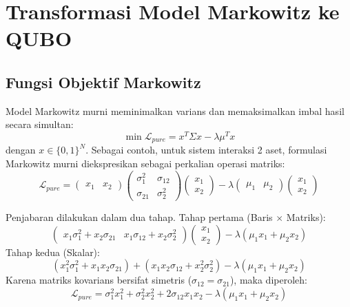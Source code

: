 \section{Transformasi Model Markowitz ke QUBO}

\subsection{Fungsi Objektif Markowitz}
Model Markowitz murni meminimalkan varians dan memaksimalkan imbal hasil secara simultan:
\begin{equation}
\min \mathcal{L}_{pure} = x^T \Sigma x - \lambda \mu^T x
\end{equation}
dengan $x \in \{0, 1\}^N$. Sebagai contoh, untuk sistem interaksi 2 aset, formulasi Markowitz murni diekspresikan sebagai perkalian operasi matriks:
\begin{equation}
\mathcal{L}_{pure} = \begin{pmatrix} x_1 & x_2 \end{pmatrix} \begin{pmatrix} \sigma_1^2 & \sigma_{12} \\ \sigma_{21} & \sigma_2^2 \end{pmatrix} \begin{pmatrix} x_1 \\ x_2 \end{pmatrix} - \lambda \begin{pmatrix} \mu_1 & \mu_2 \end{pmatrix} \begin{pmatrix} x_1 \\ x_2 \end{pmatrix}
\end{equation}

Penjabaran dilakukan dalam dua tahap. Tahap pertama (Baris $\times$ Matriks):
\begin{equation}
\begin{pmatrix} x_1 \sigma_1^2 + x_2 \sigma_{21} & x_1 \sigma_{12} + x_2 \sigma_2^2 \end{pmatrix} \begin{pmatrix} x_1 \\ x_2 \end{pmatrix} - \lambda(\mu_1 x_1 + \mu_2 x_2)
\end{equation}
Tahap kedua (Skalar):
\begin{equation}
(x_1^2 \sigma_1^2 + x_1 x_2 \sigma_{21}) + (x_1 x_2 \sigma_{12} + x_2^2 \sigma_2^2) - \lambda(\mu_1 x_1 + \mu_2 x_2)
\end{equation}
Karena matriks kovarians bersifat simetris ($\sigma_{12} = \sigma_{21}$), maka diperoleh:
\begin{equation}
\mathcal{L}_{pure} = \sigma_1^2 x_1^2 + \sigma_2^2 x_2^2 + 2\sigma_{12}x_1 x_2 - \lambda(\mu_1 x_1 + \mu_2 x_2)
\end{equation}

